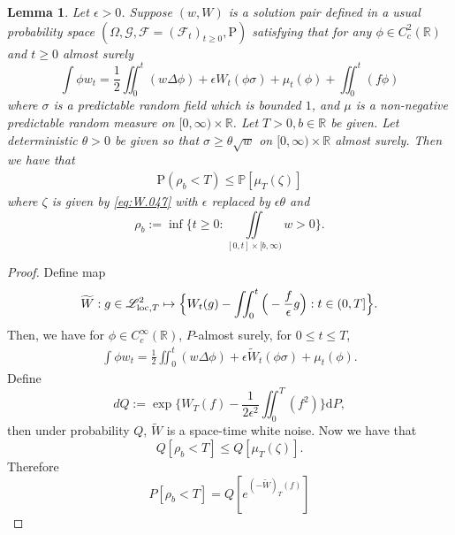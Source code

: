 \documentclass[12pt,a4paper]{amsart}
\numberwithin{equation}{section}
\theoremstyle{plain}
\newtheorem{lemma}[theorem]{Lemma}
\theoremstyle{remark}
\begin{document}
\begin{lemma}
	Let $\epsilon > 0$.
	Suppose $(w,W)$ is a solution pair defined in a usual probability space $(\Omega, \mathcal G,\mathcal F = (\mathcal F_t)_{t\geq 0}, \mathrm P) $ satisfying that for any $\phi\in C_c^2(\mathbb R)$ and $t\geq 0$ almost surely
	\begin{equation}\label{eq:W.048}
	\int \phi w_t
	= \frac{1}{2}\iint_0^t (w\Delta \phi) + \epsilon W_t(\phi\sigma) + \mu_t(\phi ) + \iint_0^t (f\phi)
	\end{equation}
	where $\sigma$ is a predictable random field which is bounded $1$, and $\mu$ is a non-negative predictable random measure on $[0,\infty) \times\mathbb R$.
	Let $T>0, b \in \mathbb R$ be given.
	Let deterministic $\theta > 0$ be given so that $\sigma \geq  \theta \sqrt{w}$ on $[0,\infty) \times \mathbb R$ almost surely.
	Then we have that
	\begin{align}
	\mathrm P( \rho_b < T) \leq \mathbb P[\mu_T(\zeta)]
	\end{align}
	where $\zeta$ is given by  \eqref{eq:W.047} with $\epsilon$ replaced by $\epsilon \theta$ and 
	\[\rho_b := \inf\Big\{t\geq 0: \iint\limits_{[0,t]\times [b, \infty)}  w > 0\Big\}.\]
\end{lemma}
\begin{proof}
	Define map 
\[
	\widetilde W: g \in \mathscr L^2_{{\rm loc}, T} \mapsto \Big\{W_t(g) - \iint_0^t \Big(- \frac{f}{\epsilon}g\Big): t\in (0,T]\Big\}. 
\]
	Then, we have for $\phi \in C_c^\infty(\mathbb R)$, $P$-almost surely, for $0 \leq t\leq T$, 
\begin{align} \label{eq:W2.1}
	\int \phi w_t
	= \frac{1}{2}\iint_0^t (w\Delta \phi) + \epsilon \widetilde W_t(\phi\sigma) + \mu_t(\phi ).
\end{align}
	Define 
\[
	dQ := \exp\Big\{W_T(f) - \frac{1}{2 \epsilon^2}\iint_0^T (f^2)\Big\} \mathrm d P,
\]
	then under probability $Q$, $\widetilde W$ is a space-time white noise. 
	Now we have that
\[
	Q[\rho_b < T] \leq Q[\mu_T(\zeta)].
\]
	Therefore
\[
	P[\rho_b < T] = Q[e^{(-\widetilde W)_T(f)}]
\]
\end{proof}
\end{document}

